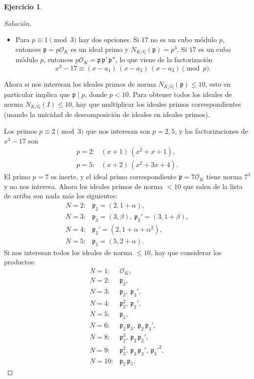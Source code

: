 \documentclass{article}
\newcounter{tarea}
\theoremstyle{definition}
\newtheorem{ejercicio}{Ejercicio}[tarea]
\newenvironment{solucion}{\begin{proof}[Solución]}{\end{proof}}
\newcommand{\QQ}{\mathbb{Q}}
\renewcommand{\O}{\mathcal{O}}
\begin{document}
\begin{ejercicio}
\begin{solucion}
\begin{itemize}
    \item Para $p \equiv 1 \pmod{3}$ hay dos opciones.
      Si $17$ no es un cubo módulo $p$, entonces $\mathfrak{p} = p\O_K$ es un
      ideal primo y $N_{K/\QQ} (\mathfrak{p}) = p^3$.
      Si $17$ es un cubo módulo $p$, entonces
      $p\O_K = \mathfrak{p} \, \mathfrak{p}' \, \mathfrak{p}''$, lo que viene
      de la factorización
      $$x^3 - 17 \equiv (x - a_1)\,(x - a_2)\,(x - a_3) \pmod{p}.$$
    \end{itemize}

    Ahora si nos interesan los ideales primos de norma
    $N_{K/\QQ} (\mathfrak{p}) \le 10$, esto en particular implica que
    $\mathfrak{p} \mid p$, donde $p < 10$. Para obtener todos los ideales de
    norma $N_{K/\QQ} (I) \le 10$, hay que multiplicar los ideales primos
    correspondientes (usando la unicidad de descomposición de ideales en ideales
    primos).

    Los primos $p \equiv 2 \pmod{3}$ que nos interesan son $p = 2, 5$, y las
    factorizaciones de $x^3 - 17$ son
    \begin{align*}
      p=2\colon & (x+1)\,(x^2 + x + 1),\\
      p=5\colon & (x+2)\,(x^2 + 3x + 4).
    \end{align*}
    El primo $p = 7$ es inerte, y el ideal primo correspondiente
    $\mathfrak{p} = 7\O_K$ tiene norma $7^3$ y no nos interesa. Ahora los
    ideales primos de norma $< 10$ que salen de la lista de arriba son
    nada más los siguientes:
    \begin{align*}
      N=2\colon & \mathfrak{p}_2 = (2, 1+\alpha),\\
      N=3\colon & \mathfrak{p}_3 = (3, \beta), ~ \mathfrak{p}_3' = (3, 1+\beta),\\
      N=4\colon & \mathfrak{p}_2' = (2, 1 + \alpha + \alpha^2),\\
      N=5\colon & \mathfrak{p}_5 = (5, 2 + \alpha).
    \end{align*}
    Si nos interesan todos los ideales de norma $\le 10$, hay que
    considerar los productos:
    \begin{align*}
      N=1\colon & \O_K, \\
      N=2\colon & \mathfrak{p}_2,\\
      N=3\colon & \mathfrak{p}_3, ~ \mathfrak{p}_3',\\
      N=4\colon & \mathfrak{p}_2^2, ~ \mathfrak{p}_2',\\
      N=5\colon & \mathfrak{p}_5,\\
      N=6\colon & \mathfrak{p}_2\,\mathfrak{p}_3, ~ \mathfrak{p}_2\,\mathfrak{p}_3',\\
      N=8\colon & \mathfrak{p}_2^3, ~ \mathfrak{p}_2\,\mathfrak{p}_2',\\
      N=9\colon & \mathfrak{p}_3^2, ~ \mathfrak{p}_3\,\mathfrak{p}_3', ~ \mathfrak{p}_3'^2,\\
      N=10\colon & \mathfrak{p}_2\,\mathfrak{p}_5,
    \end{align*}


\end{solucion}
\end{ejercicio}
\end{document}
